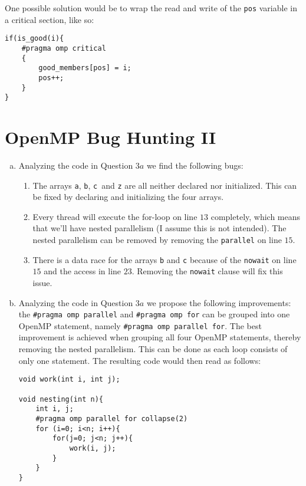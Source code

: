 \documentclass[a4paper,10pt]{article} %
\begin{document}
One possible solution would be to wrap the read and write of the \texttt{pos} variable in a critical section, like so:

\begin{verbatim}
if(is_good(i){ 
    #pragma omp critical
    {
        good_members[pos] = i;
        pos++;
    }
}
\end{verbatim}


\section{OpenMP Bug Hunting II}
\begin{enumerate}[a)]
\setcounter{enumi}{0}
\item
Analyzing the code in Question $3a$ we find the following bugs:
\begin{enumerate}[1]
    \item The arrays \texttt{a}, \texttt{b}, \texttt{c}\ and \texttt{z} are all neither declared nor initialized. This can be fixed by declaring and initializing the four arrays.
    \item Every thread will execute the for-loop on line $13$ completely, which means that we'll have nested parallelism (I assume this is not intended). The nested parallelism can be removed by removing the \texttt{parallel} on line $15$.
    \item There is a data race for the arrays \texttt{b} and \texttt{c} because of the \texttt{nowait} on line $15$ and the access in line $23$. Removing the \texttt{nowait} clause will fix this issue.
\end{enumerate}
\item
Analyzing the code in Question $3a$ we propose the following improvements: the \texttt{\#pragma omp parallel} and \texttt{\#pragma omp for} can be grouped into one OpenMP statement, namely \texttt{\#pragma omp parallel for}. The best improvement is achieved when grouping all four OpenMP statements, thereby removing the nested parallelism. This can be done as each loop consists of only one statement. The resulting code would then read as follows:

\begin{verbatim}
void work(int i, int j);

void nesting(int n){
    int i, j;
    #pragma omp parallel for collapse(2)
    for (i=0; i<n; i++){
        for(j=0; j<n; j++){
            work(i, j);
        }
    }
}
\end{verbatim}

\end{enumerate}

\bigskip

\printbibliography

\end{document}
